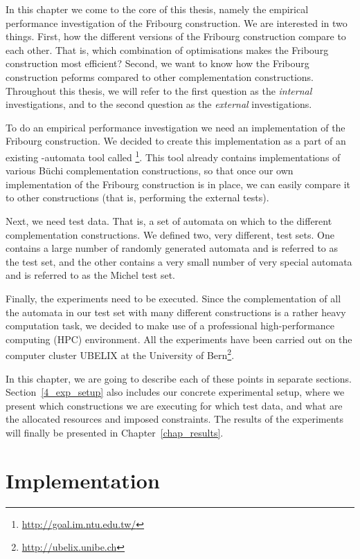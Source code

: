 In this chapter we come to the core of this thesis, namely the empirical performance investigation of the Fribourg construction. We are interested in two things. First, how the different versions of the Fribourg construction compare to each other. That is, which combination of optimisations makes the Fribourg construction most efficient? Second, we want to know how the Fribourg construction peforms compared to other complementation constructions. Throughout this thesis, we will refer to the first question as the \textit{internal} investigations, and to the second question as the \textit{external} investigations.

To do an empirical performance investigation we need an implementation of the Fribourg construction. We decided to create this implementation as a part of an existing \om-automata tool called \goal\footnote{\url{http://goal.im.ntu.edu.tw/}}. This tool already contains implementations of various Büchi complementation constructions, so that once our own implementation of the Fribourg construction is in place, we can easily compare it to other constructions (that is, performing the external tests).

Next, we need test data. That is, a set of automata on which to the different complementation constructions. We defined two, very different, test sets. One contains a large number of randomly generated automata and is referred to as the \goal{} test set, and the other contains a very small number of very special automata and is referred to as the Michel test set.

Finally, the experiments need to be executed. Since the complementation of all the automata in our test set with many different constructions is a rather heavy computation task, we decided to make use of a professional high-performance computing (HPC) environment. All the experiments have been carried out on the computer cluster UBELIX at the University of Bern\footnote{\url{http://ubelix.unibe.ch}}.

In this chapter, we are going to describe each of these points in separate sections. Section~\ref{4_exp_setup} also includes our concrete experimental setup, where we present which constructions we are executing for which test data, and what are the allocated resources and imposed constraints. The results of the experiments will finally be presented in Chapter~\ref{chap_results}.


\section{Implementation}



